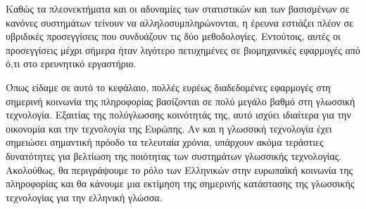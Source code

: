 \documentclass[]{../../metanetpaper}
\begin{document}
\begin{multicols}{2}
Καθώς τα πλεονεκτήματα και οι αδυναμίες των στατιστικών και των βασισμένων σε κανόνες συστημάτων τείνουν να αλληλοσυμπληρώνονται, η  έρευνα εστιάζει πλέον σε υβριδικές προσεγγίσεις που συνδυάζουν τις δύο μεθοδολογίες. Εντούτοις, αυτές οι προσεγγίσεις μέχρι σήμερα ήταν λιγότερο πετυχημένες σε βιομηχανικές εφαρμογές από ό,τι στο ερευνητικό εργαστήριο. 

Όπως είδαμε σε αυτό το κεφάλαιο, πολλές ευρέως διαδεδομένες εφαρμογές στη σημερινή κοινωνία της πληροφορίας βασίζονται σε πολύ μεγάλο βαθμό στη γλωσσική τεχνολογία. Εξαιτίας της πολύγλωσσης κοινότητάς της, αυτό ισχύει ιδιαίτερα για την οικονομία και την τεχνολογία της Ευρώπης. Αν και η γλωσσική τεχνολογία έχει σημειώσει σημαντική πρόοδο τα τελευταία χρόνια, υπάρχουν ακόμα τεράστιες δυνατότητες για βελτίωση της ποιότητας των συστημάτων γλωσσικής τεχνολογίας. Ακολούθως, θα περιγράψουμε το ρόλο των Ελληνικών στην ευρωπαϊκή κοινωνία της πληροφορίας και θα κάνουμε μια εκτίμηση της σημερινής κατάστασης της γλωσσικής τεχνολογίας για την ελληνική γλώσσα.
\end{multicols}

\clearpage

\end{document}
